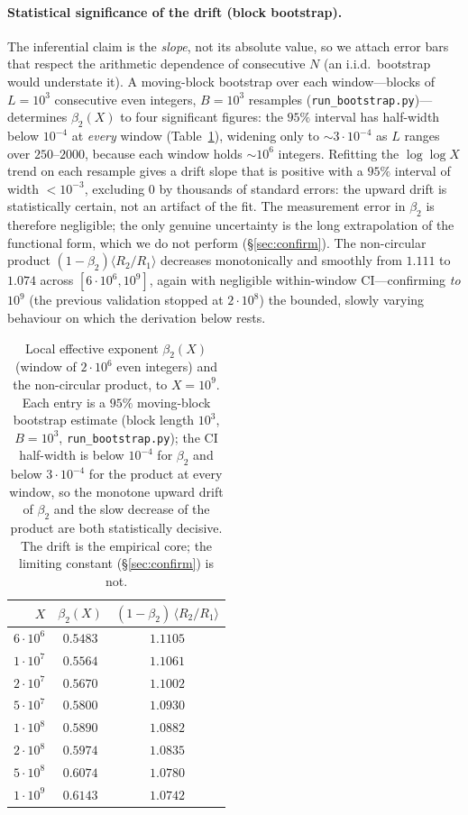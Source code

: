 \documentclass[]{interact}%
\begin{document}
\paragraph{Statistical significance of the drift (block bootstrap).}
The inferential claim is the \emph{slope}, not its absolute value, so we attach error bars that
respect the arithmetic dependence of consecutive $N$ (an i.i.d.\ bootstrap would understate it).
A moving-block bootstrap over each window---blocks of $L=10^{3}$ consecutive even integers,
$B=10^{3}$ resamples (\texttt{run\_bootstrap.py})---determines $\beta_2(X)$ to four significant
figures: the $95\%$ interval has half-width below $10^{-4}$ at \emph{every} window
(Table~\ref{tab:bootstrap}), widening only to $\sim3\cdot10^{-4}$ as $L$ ranges over
$250$--$2000$, because each window holds $\sim10^{6}$ integers. Refitting the $\log\log X$ trend
on each resample gives a drift slope that is positive with a $95\%$ interval of width $<10^{-3}$,
excluding $0$ by thousands of standard errors: the upward drift is statistically certain, not an
artifact of the fit. The measurement error in $\beta_2$ is therefore negligible; the only genuine
uncertainty is the long extrapolation of the functional form, which we do not perform
(\S\ref{sec:confirm}). The non-circular product $(1-\beta_2)\langle R_2/R_1\rangle$ decreases
monotonically and smoothly from $1.111$ to $1.074$ across $[6\cdot10^{6},10^{9}]$, again with
negligible within-window CI---confirming \emph{to $10^{9}$} (the previous validation stopped at
$2\cdot10^{8}$) the bounded, slowly varying behaviour on which the derivation below rests.

\begin{table}[h]
\centering
\begin{tabular}{rcc}
\toprule
$X$ & $\beta_2(X)$ & $(1-\beta_2)\,\langle R_2/R_1\rangle$\\
\midrule
$6\cdot10^{6}$ & $0.5483$ & $1.1105$\\
$1\cdot10^{7}$ & $0.5564$ & $1.1061$\\
$2\cdot10^{7}$ & $0.5670$ & $1.1002$\\
$5\cdot10^{7}$ & $0.5800$ & $1.0930$\\
$1\cdot10^{8}$ & $0.5890$ & $1.0882$\\
$2\cdot10^{8}$ & $0.5974$ & $1.0835$\\
$5\cdot10^{8}$ & $0.6074$ & $1.0780$\\
$1\cdot10^{9}$ & $0.6143$ & $1.0742$\\
\bottomrule
\end{tabular}
\caption{Local effective exponent $\beta_2(X)$ (window of $2\cdot10^{6}$ even integers) and the
non-circular product, to $X=10^{9}$. Each entry is a $95\%$ moving-block bootstrap estimate
(block length $10^{3}$, $B=10^{3}$, \texttt{run\_bootstrap.py}); the CI half-width is below
$10^{-4}$ for $\beta_2$ and below $3\cdot10^{-4}$ for the product at every window, so the
monotone upward drift of $\beta_2$ and the slow decrease of the product are both statistically
decisive. The drift is the empirical core; the limiting constant (\S\ref{sec:confirm}) is not.}
\label{tab:bootstrap}
\end{table}
\end{document}
